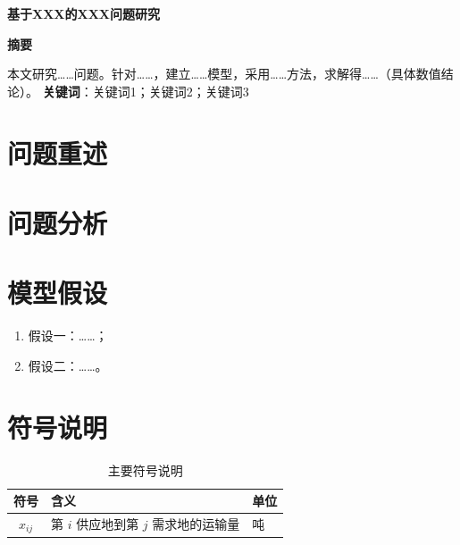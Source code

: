 \documentclass[UTF8,zihao=-4]{ctexart}
\begin{document}
\begin{center}
  {\bfseries 基于XXX的XXX问题研究}
\end{center}

\begin{center}\textbf{摘\quad 要}\end{center}
本文研究……问题。针对……，建立……模型，采用……方法，求解得……（具体数值结论）。
\textbf{关键词}：关键词1；关键词2；关键词3
\newpage

\section{问题重述}
\section{问题分析}
\section{模型假设}
\begin{enumerate}
  \item 假设一：……；
  \item 假设二：……。
\end{enumerate}

\section{符号说明}
\begin{table}[H]\centering
  \caption{主要符号说明}\label{tab:notation}
  \begin{tabular}{cll}
    \toprule
    符号 & 含义 & 单位 \\
    \midrule
    $x_{ij}$ & 第 $i$ 供应地到第 $j$ 需求地的运输量 & 吨 \\
    \bottomrule
  \end{tabular}
\end{table}
\end{document}
